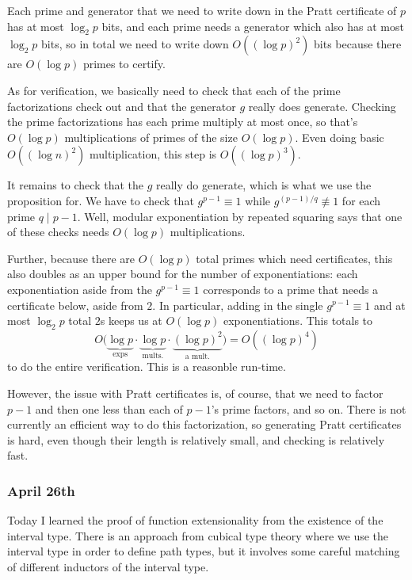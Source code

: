 Each prime and generator that we need to write down in the Pratt certificate of $p$ has at most $\log_2p$ bits, and each prime needs a generator which also has at most $\log_2p$ bits, so in total we need to write down $O((\log p)^2)$ bits because there are $O(\log p)$ primes to certify.

As for verification, we basically need to check that each of the prime factorizations check out and that the generator $g$ really does generate. Checking the prime factorizations has each prime multiply at most once, so that's $O(\log p)$ multiplications of primes of the size $O(\log p).$ Even doing basic $O((\log n)^2)$ multiplication, this step is $O((\log p)^3).$

It remains to check that the $g$ really do generate, which is what we use the proposition for. We have to check that $g^{p-1}\equiv1$ while $g^{(p-1)/q}\not\equiv1$ for each prime $q\mid p-1.$ Well, modular exponentiation by repeated squaring says that one of these checks needs $O(\log p)$ multiplications.

Further, because there are $O(\log p)$ total primes which need certificates, this also doubles as an upper bound for the number of exponentiations: each exponentiation aside from the $g^{p-1}\equiv1$ corresponds to a prime that needs a certificate below, aside from $2.$ In particular, adding in the single $g^{p-1}\equiv1$ and at most $\log_2p$ total $2$s keeps us at $O(\log p)$ exponentiations. This totals to
\[O\big(\underbrace{\log p}_{\text{exps}}\cdot\underbrace{\log p}_{\text{mults.}}\cdot\underbrace{(\log p)^2}_{\text{a mult.}}\big)=O\left((\log p)^4\right)\]
to do the entire verification. This is a reasonble run-time.

However, the issue with Pratt certificates is, of course, that we need to factor $p-1$ and then one less than each of $p-1$'s prime factors, and so on. There is not currently an efficient way to do this factorization, so generating Pratt certificates is hard, even though their length is relatively small, and checking is relatively fast.

\subsubsection{April 26th}
Today I learned the proof of function extensionality from the existence of the interval type. There is an approach from cubical type theory where we use the interval type in order to define path types, but it involves some careful matching of different inductors of the interval type.

